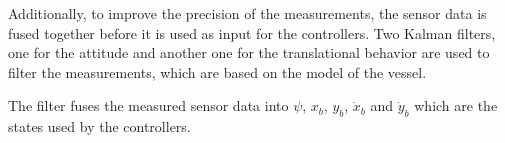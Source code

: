 Additionally, to improve the precision of the measurements, the sensor data is fused together before it is used as input for the controllers. Two Kalman filters, one for the attitude and another one for the translational behavior are used to filter the measurements, which are based on the model of the vessel. 
 
The filter fuses the measured sensor data into $\psi$, $x_{b}$, $y_{b}$, $\dot{x}_{b}$ and $\dot{y}_{b}$ which are the states used by the controllers. 

